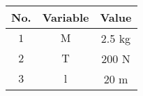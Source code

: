 \begin{tabular}{|c|c|c|}
	\hline
	\textbf{No.} & \textbf{Variable} & \textbf{Value}\\[6pt]
	\hline
	$1$ & $\text{M}$  & 2.5 kg\\[2pt]
	\hline
	$2$ & $\text{T}$ & 200 $\text{N}$\\[2pt]
	\hline
	$3$ & $\text{l}$ & 20 $\text{m}$\\[2pt]
	\hline
\end{tabular}